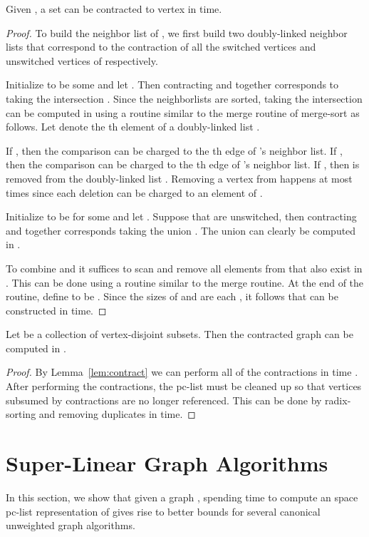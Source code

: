 \documentclass{llncs}
\begin{document}
\begin{lemma}\label{lem:contract}
Given , a set  can be contracted to vertex  in  time.
\end{lemma}
\begin{proof}
To build the neighbor list of , we first build two doubly-linked neighbor lists  that correspond to the contraction of all the switched vertices  and unswitched vertices of  respectively.

Initialize  to be  some  and let .  Then contracting  and  together corresponds to taking the intersection .  Since the neighborlists are sorted, taking the intersection  can be computed in  using a routine similar to the merge routine of merge-sort as follows.  Let  denote the th element of a doubly-linked list .

If , then the comparison can be charged to the th edge of 's neighbor list.  If , then the comparison can be charged to the th edge of 's neighbor list.  If , then  is removed from the doubly-linked list .  Removing a vertex from  happens at most  times since each deletion can be charged to an element of .  

Initialize  to be  for some  and let . Suppose that  are unswitched, then contracting  and  together corresponds taking the union .  The union  can clearly be computed in .

To combine  and  it suffices to scan  and remove all elements from  that also exist in . This can be done using a routine similar to the merge routine.  At the end of the routine, define  to be .  Since the sizes of  and  are each , it follows that  can be constructed in  time.
\end{proof}

\begin{lemma}\label{lem:contractG}
Let  be a collection of vertex-disjoint subsets. Then the contracted graph  can be computed in .
\end{lemma}
\begin{proof}
By Lemma~\ref{lem:contract} we can perform all of the contractions in time .  After performing the contractions, the pc-list must be cleaned up so that vertices subsumed by contractions are no longer referenced.  This can be done by radix-sorting and removing duplicates in  time.
\end{proof}


\section{Super-Linear Graph Algorithms}
In this section, we show that given a graph , spending  time to compute an  space pc-list representation of  gives rise to better bounds for several canonical unweighted graph algorithms.  
\end{document}
